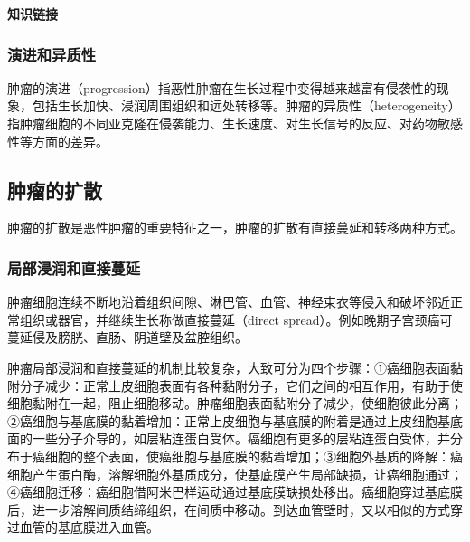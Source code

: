 \begin{center}
  \textbf{知识链接}
\end{center}

\subsubsection{演进和异质性}

肿瘤的演进（progression）指恶性肿瘤在生长过程中变得越来越富有侵袭性的现象，包括生长加快、浸润周围组织和远处转移等。肿瘤的异质性（heterogeneity）指肿瘤细胞的不同亚克隆在侵袭能力、生长速度、对生长信号的反应、对药物敏感性等方面的差异。

\subsection{肿瘤的扩散}

肿瘤的扩散是恶性肿瘤的重要特征之一，肿瘤的扩散有直接蔓延和转移两种方式。

\subsubsection{局部浸润和直接蔓延}

肿瘤细胞连续不断地沿着组织间隙、淋巴管、血管、神经束衣等侵入和破坏邻近正常组织或器官，并继续生长称做直接蔓延（direct
spread）。例如晚期子宫颈癌可蔓延侵及膀胱、直肠、阴道壁及盆腔组织。

肿瘤局部浸润和直接蔓延的机制比较复杂，大致可分为四个步骤：①癌细胞表面黏附分子减少：正常上皮细胞表面有各种黏附分子，它们之间的相互作用，有助于使细胞黏附在一起，阻止细胞移动。肿瘤细胞表面黏附分子减少，使细胞彼此分离；②癌细胞与基底膜的黏着增加：正常上皮细胞与基底膜的附着是通过上皮细胞基底面的一些分子介导的，如层粘连蛋白受体。癌细胞有更多的层粘连蛋白受体，并分布于癌细胞的整个表面，使癌细胞与基底膜的黏着增加；③细胞外基质的降解：癌细胞产生蛋白酶，溶解细胞外基质成分，使基底膜产生局部缺损，让癌细胞通过；④癌细胞迁移：癌细胞借阿米巴样运动通过基底膜缺损处移出。癌细胞穿过基底膜后，进一步溶解间质结缔组织，在间质中移动。到达血管壁时，又以相似的方式穿过血管的基底膜进入血管。

